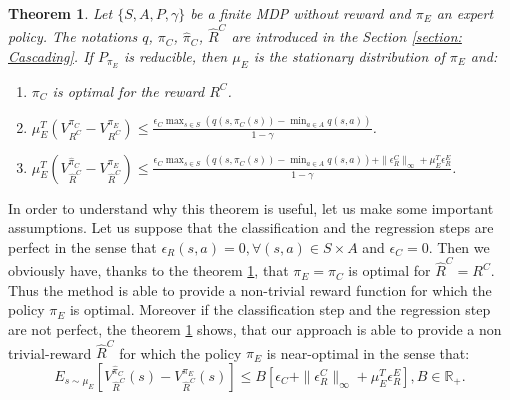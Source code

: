 \documentclass{article} %
\newtheorem{theorem}{Theorem}
\newcommand{\0}{\mathbf{0}}
\newcommand{\1}{\mathbf{1}}
\begin{document}
\begin{theorem}
\label{theorem : results}
Let $\{S,A,P,\gamma\}$ be a finite MDP without reward and $\pi_E$ an expert policy.
The notations $q$, $\pi_C$, $\hat{\pi}_C$, $\hat{R}^C$ are introduced in the Section \ref{section: Cascading}.
If $P_{\pi_E}$ is reducible, then $\mu_E$ is the stationary distribution of $\pi_E$ and:
\begin{enumerate}
\item $\pi_C$ is optimal for the reward $R^C$.
\item $\mu_E^T(V^{\pi_C}_{R^C}-V^{\pi_E}_{R^C})\leq\frac{\epsilon_C\max_{s\in S}(q(s,\pi_C(s))-\min_{a\in A}q(s,a))}{1-\gamma}$.
\item $\mu_E^T(V^{\hat{\pi}_C}_{\hat{R}^C}-V^{\pi_E}_{\hat{R}^C})\leq \frac{\epsilon_C\max_{s\in S}(q(s,\pi_C(s))-\min_{a\in A}q(s,a))+\|\epsilon^C_R\|_{\infty}+\mu_E^T\epsilon^E_R}{1-\gamma}$.
\end{enumerate}
\end{theorem}
In order to understand why this theorem is useful, let us make some important assumptions. Let us suppose that the classification and the regression steps are perfect in the sense that $\epsilon_R(s,a)=0,\forall (s,a)\in S\times A$ and $\epsilon_C=0$. Then we obviously have, thanks to the theorem \ref{theorem : results}, that $\pi_E=\pi_C$ is optimal for $\hat{R}^C=R^C$. Thus the method is able to provide a non-trivial reward function for which the policy $\pi_E$ is optimal. Moreover if the classification step and the regression step are not perfect, the theorem \ref{theorem : results} shows, that our approach is able to provide a non trivial-reward $\hat{R}^C$ for which the policy $\pi_E$ is near-optimal in the sense that:
\begin{equation}
E_{s \sim \mu_E}[V^{\hat{\pi}_C}_{\hat{R}^C}(s)-V^{\pi_E}_{\hat{R}^C}(s)]\leq B[\epsilon_C+\|\epsilon^C_R\|_{\infty}+\mu_E^T\epsilon^E_R], B\in\mathbb{R}_+.
\end{equation}
\end{document}
